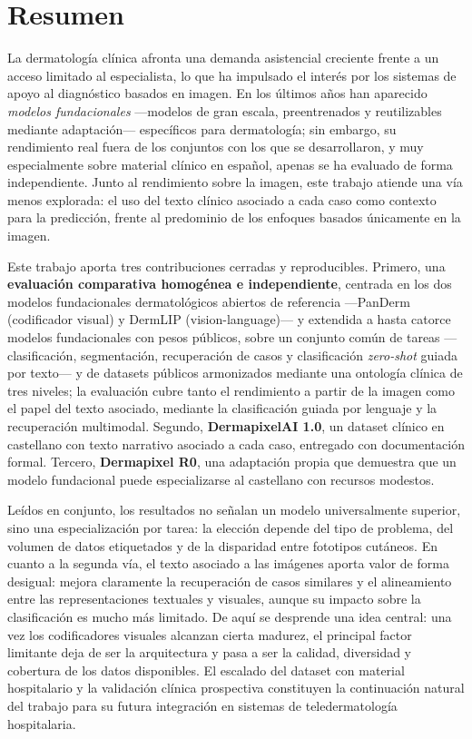 
\chapter*{Resumen}
\vspace*{0.4cm}

La dermatología clínica afronta una demanda asistencial creciente frente a un acceso limitado al especialista, lo que ha impulsado el interés por los sistemas de apoyo al diagnóstico basados en imagen. En los últimos años han aparecido \emph{modelos fundacionales} ---modelos de gran escala, preentrenados y reutilizables mediante adaptación--- específicos para dermatología; sin embargo, su rendimiento real fuera de los conjuntos con los que se desarrollaron, y muy especialmente sobre material clínico en español, apenas se ha evaluado de forma independiente. Junto al rendimiento sobre la imagen, este trabajo atiende una vía menos explorada: el uso del texto clínico asociado a cada caso como contexto para la predicción, frente al predominio de los enfoques basados únicamente en la imagen.
\par Este trabajo aporta tres contribuciones cerradas y reproducibles. Primero, una \textbf{evaluación comparativa homogénea e independiente}, centrada en los dos modelos fundacionales dermatológicos abiertos de referencia ---PanDerm (codificador visual) y DermLIP (vision-language)--- y extendida a hasta catorce modelos fundacionales con pesos públicos, sobre un conjunto común de tareas ---clasificación, segmentación, recuperación de casos y clasificación \emph{zero-shot} guiada por texto--- y de datasets públicos armonizados mediante una ontología clínica de tres niveles; la evaluación cubre tanto el rendimiento a partir de la imagen como el papel del texto asociado, mediante la clasificación guiada por lenguaje y la recuperación multimodal. Segundo, \textbf{DermapixelAI 1.0}, un dataset clínico en castellano con texto narrativo asociado a cada caso, entregado con documentación formal. Tercero, \textbf{Dermapixel R0}, una adaptación propia que demuestra que un modelo fundacional puede especializarse al castellano con recursos modestos.
\par Leídos en conjunto, los resultados no señalan un modelo universalmente superior, sino una especialización por tarea: la elección depende del tipo de problema, del volumen de datos etiquetados y de la disparidad entre fototipos cutáneos. En cuanto a la segunda vía, el texto asociado a las imágenes aporta valor de forma desigual: mejora claramente la recuperación de casos similares y el alineamiento entre las representaciones textuales y visuales, aunque su impacto sobre la clasificación es mucho más limitado. De aquí se desprende una idea central: una vez los codificadores visuales alcanzan cierta madurez, el principal factor limitante deja de ser la arquitectura y pasa a ser la calidad, diversidad y cobertura de los datos disponibles. El escalado del dataset con material hospitalario y la validación clínica prospectiva constituyen la continuación natural del trabajo para su futura integración en sistemas de teledermatología hospitalaria.

